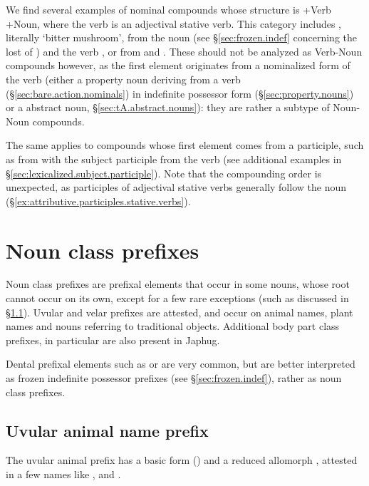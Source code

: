 We find several examples of nominal compounds whose structure is +Verb +Noun, where the verb is an adjectival stative verb. This category includes \textit{}, literally `bitter mushroom', from the noun  (see §\ref{sec:frozen.indef} concerning the lost of ) and the verb , or  from  and . These should not be analyzed as Verb-Noun compounds however, as the first element originates from a nominalized form of the verb (either a property noun deriving from a verb (§\ref{sec:bare.action.nominals}) in indefinite possessor  form (§\ref{sec:property.nouns}) or a  abstract noun, §\ref{sec:tA.abstract.nouns}): they are rather a subtype of Noun-Noun compounds.

The same applies to compounds whose first element comes from a participle, such as  from  with the subject participle   from the verb  (see additional examples in §\ref{sec:lexicalized.subject.participle}). Note that the compounding order is unexpected, as participles of adjectival stative verbs generally follow the noun (§\ref{ex:attributive.participles.stative.verbs}). 
 

\section{Noun class prefixes} \label{sec:class.prefixes}
Noun class prefixes are prefixal elements that occur in some nouns, whose root cannot occur on its own, except for a few rare exceptions (such as  discussed in §\ref{sec:uvular.animal}). Uvular  and velar  prefixes are attested, and occur on animal names,  plant names and nouns referring to traditional objects. Additional body part class prefixes, in particular  are also present in Japhug. 

Dental prefixal elements such as  or  are very common, but  are  better interpreted as frozen indefinite possessor prefixes (see §\ref{sec:frozen.indef}), rather as noun class prefixes.

\subsection{Uvular animal name prefix} \label{sec:uvular.animal}
The uvular animal prefix has a basic form  () and a reduced allomorph , attested in a few names like ,  and .

